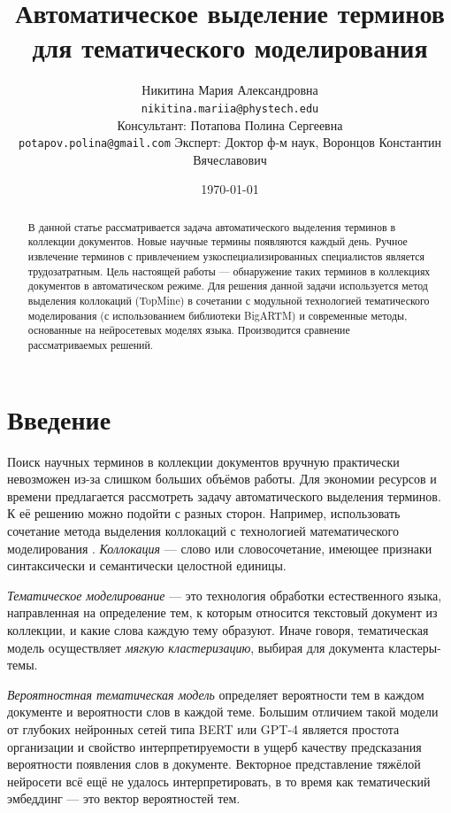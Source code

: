 \documentclass[a4paper, 12pt]{article}
\title{Автоматическое выделение терминов для тематического моделирования}
\author{
    Никитина Мария Александровна \\
	\texttt{nikitina.mariia@phystech.edu} \\
	\And
	Консультант: Потапова Полина Сергеевна \\
	\texttt{potapov.polina@gmail.com}
 	\And
	Эксперт: Доктор ф-м наук, Воронцов Константин Вячеславович
}
\date{\today}
\begin{document}
\maketitle

\begin{abstract}
В данной статье рассматривается задача автоматического выделения терминов в коллекции документов. Новые научные термины появляются каждый день.
Ручное извлечение терминов с привлечением узкоспециализированных
специалистов является трудозатратным. Цель настоящей работы --- обнаружение таких терминов в коллекциях документов в автоматическом режиме. Для решения данной задачи используется метод выделения коллокаций (TopMine) в сочетании с модульной технологией тематического моделирования (с использованием библиотеки BigARTM) и современные методы, основанные на нейросетевых моделях языка. Производится сравнение рассматриваемых решений.
\end{abstract}


\section{Введение}

        Поиск научных терминов в коллекции документов вручную практически невозможен из-за слишком больших объёмов работы. Для экономии ресурсов и времени предлагается рассмотреть задачу автоматического выделения терминов. К её решению можно подойти с разных сторон. Например, использовать сочетание метода выделения коллокаций с технологией математического моделирования \citep{ElKishky2014}. \textit{Коллокация} --- слово или словосочетание, имеющее признаки синтаксически и семантически целостной единицы.

        \textit{Тематическое моделирование} --- это технология обработки естественного языка, направленная на определение тем, к которым относится текстовый документ из коллекции, и какие слова каждую тему образуют. Иначе говоря, тематическая модель осуществляет \textit{мягкую кластеризацию}, выбирая для документа кластеры-темы.

        \textit{Вероятностная тематическая модель} определяет вероятности тем в каждом документе и вероятности слов в каждой теме. Большим отличием такой модели от глубоких нейронных сетей типа BERT \citep{bert} или GPT-4 \citep{https://doi.org/10.48550/arxiv.2303.08774} является простота организации и свойство интерпретируемости в ущерб качеству предсказания вероятности появления слов в документе. Векторное представление тяжёлой нейросети всё ещё не удалось интерпретировать, в то время как тематический эмбеддинг --- это вектор вероятностей тем.
\end{document}
